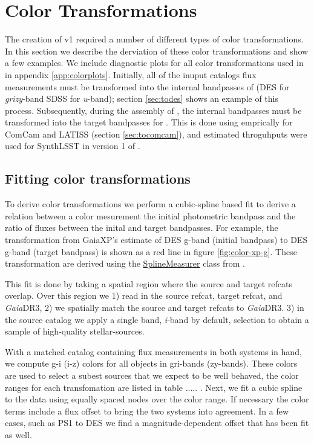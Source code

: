 \section{Color Transformations}
\label{sec:colors}
The creation of \monster v1 required a number of different types of color transformations. 
In this section we describe the derviation of these color transformations and show a few examples. 
We include diagnostic plots for all color transformations used in \monster in appendix \ref{app:colorplots}. 
Initially, all of the inuput catalogs flux measurements must be transformed into the internal bandpasses of \monster (DES for \emph{grizy}-band SDSS for \emph{u}-band); section \ref{sec:todes} shows an example of this process. 
Subsequently, during the assembly of \monster, the internal bandpasses must be transformed into the target bandpasses for \monster. 
This is done using emprically for ComCam and LATISS (section \ref{sec:tocomcam}), and estimated throguhputs were used for SynthLSST in version 1 of \monster. 


\subsection{Fitting color transformations}
To derive color transformations we perform a cubic-spline based fit to derive a relation between a color mesurement the initial photometric bandpass and the ratio of fluxes between the inital and target bandpasses.
For example, the transformation from GaiaXP's estimate of DES g-band (initial bandpass) to DES g-band (target bandpass) is shown as a red line in figure \ref{fig:color-xp-g}. 
These transformation are derived using the \href{https://github.com/lsst-dm/the_monster/blob/main/python/lsst/the/monster/measure_colorterms.py}{SplineMeasurer} class from \monster. 

This fit is done by taking a spatial region where the source and target refcats overlap. 
Over this region we 1) read in the source refcat, target refcat, and \emph{Gaia}DR3, 2) we spatially match the source and target refcats to \emph{Gaia}DR3. 3) in the source catalog we apply a single band, \textit{i}-band by default, selection to obtain a sample of high-quality stellar-sources.  

With a matched catalog containing flux measurements in both systems in hand, we compute g-i (i-z) colors for all objects in gri-bands (zy-bands). 
These colors are used to select a subest sources that we expect to be well behaved, the color ranges for each transfomation are listed in table ..... .
Next, we fit a cubic spline to the data using equally spaced nodes over the color range.
If necessary the color terms include a flux offset to bring the two systems into agreement. 
In a few cases, such as PS1 to DES we find a magnitude-dependent offset that has been fit as well.

